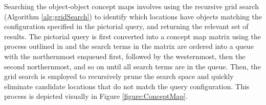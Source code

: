 Searching the object-object concept maps involves using the recursive grid search (Algorithm \ref{alg:gridSearch}) to identify which locations have objects matching the configuration specified in the pictorial query, and returning the relevant set of results. 
The pictorial query is first converted into a concept map matrix using the process outlined in  and the search terms in the matrix are ordered into a queue with the northernmost enqueued first, followed by the westernmost, then the second northernmost, and so on until all search terms are in the queue.
Then, the grid search is employed to recursively prune the search space and quickly eliminate candidate locations that do not match the query configuration.
This process is depicted visually in Figure \ref{figure:ConceptMap}.



